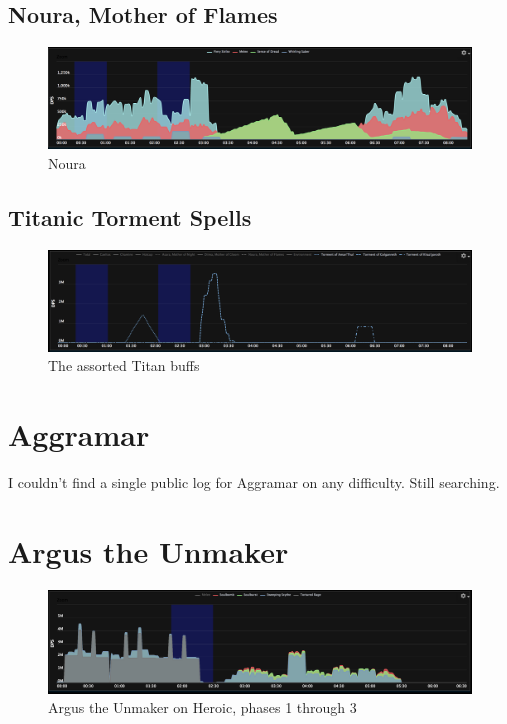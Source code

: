 \documentclass{article}
\begin{document}
\subsection{Noura, Mother of Flames}
\begin{figure}[!htb]
  \includegraphics[width=\linewidth]{09-shivarra-noura.png}
  \caption{Noura}
  \label{fig:dmg9}
\end{figure}

\subsection{Titanic Torment Spells}
\begin{figure}[!htb]
  \includegraphics[width=\linewidth]{09-shivarra-torment.png}
  \caption{The assorted Titan buffs}
  \label{fig:dmg9}
\end{figure}



\section{Aggramar}

I couldn't find a single public log for Aggramar on any difficulty. Still searching.

\section{Argus the Unmaker}

\begin{figure}[!htb]
  \includegraphics[width=\linewidth]{11-argus.png}
  \caption{Argus the Unmaker on Heroic, phases 1 through 3}
  \label{fig:dmg11}
\end{figure}
\end{document}
